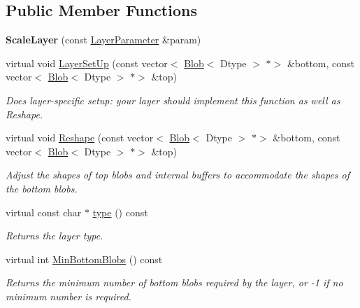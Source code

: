 \subsection*{Public Member Functions}
\begin{DoxyCompactItemize}
\item 
\mbox{\label{classcaffe_1_1_scale_layer_a5af2dfc1148383c6e8073c9660d2b88b}} 
{\bfseries Scale\+Layer} (const \mbox{\hyperlink{classcaffe_1_1_layer_parameter}{Layer\+Parameter}} \&param)
\item 
virtual void \mbox{\hyperlink{classcaffe_1_1_scale_layer_a9781f923f1ff0aad8549e0e93eebb941}{Layer\+Set\+Up}} (const vector$<$ \mbox{\hyperlink{classcaffe_1_1_blob}{Blob}}$<$ Dtype $>$ $\ast$$>$ \&bottom, const vector$<$ \mbox{\hyperlink{classcaffe_1_1_blob}{Blob}}$<$ Dtype $>$ $\ast$$>$ \&top)
\begin{DoxyCompactList}\small\item\em Does layer-\/specific setup\+: your layer should implement this function as well as Reshape. \end{DoxyCompactList}\item 
virtual void \mbox{\hyperlink{classcaffe_1_1_scale_layer_aeafe805a68903bae9a7f2b98bf453e22}{Reshape}} (const vector$<$ \mbox{\hyperlink{classcaffe_1_1_blob}{Blob}}$<$ Dtype $>$ $\ast$$>$ \&bottom, const vector$<$ \mbox{\hyperlink{classcaffe_1_1_blob}{Blob}}$<$ Dtype $>$ $\ast$$>$ \&top)
\begin{DoxyCompactList}\small\item\em Adjust the shapes of top blobs and internal buffers to accommodate the shapes of the bottom blobs. \end{DoxyCompactList}\item 
\mbox{\label{classcaffe_1_1_scale_layer_a73f354bbf33da4836b4816f4df6bd7cf}} 
virtual const char $\ast$ \mbox{\hyperlink{classcaffe_1_1_scale_layer_a73f354bbf33da4836b4816f4df6bd7cf}{type}} () const
\begin{DoxyCompactList}\small\item\em Returns the layer type. \end{DoxyCompactList}\item 
virtual int \mbox{\hyperlink{classcaffe_1_1_scale_layer_a12c10840f0fc3327854864a12054beb2}{Min\+Bottom\+Blobs}} () const
\begin{DoxyCompactList}\small\item\em Returns the minimum number of bottom blobs required by the layer, or -\/1 if no minimum number is required. \end{DoxyCompactList}\item 

\end{DoxyCompactItemize}
